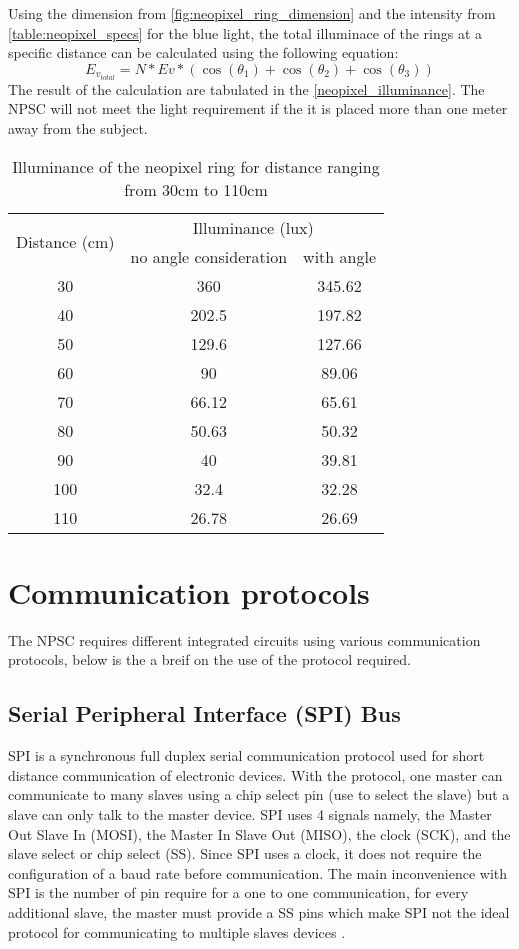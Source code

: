 Using the dimension from \cref{fig:neopixel_ring_dimension} and the intensity from \cref{table:neopixel_specs} for the blue light, the total illuminace of the rings at a specific distance can be calculated using the following equation:
\begin{equation}\label{eq:total_illuminance}
E_{v_{total}} = N*Ev*(\cos(\theta_1)+\cos(\theta_2)+\cos(\theta_3))
\end{equation}
The result of the calculation are tabulated in the \cref{neopixel_illuminance}. The NPSC will not meet the light requirement if the it is placed more than one meter away from the subject.
\begin{table}[h!]
\centering
\begin{tabular}{ccc}
\hline
\hline
\multirow{2}{*}{Distance (cm)}  & \multicolumn{2}{c}{Illuminance (lux)} \\  
 & no angle consideration & with angle \\
\hline
30 & 360 & 345.62\\
40 & 202.5 & 197.82\\
50 & 129.6 & 127.66\\
60 & 90 & 89.06\\
70 & 66.12 & 65.61\\
80 & 50.63 & 50.32\\
90 & 40 & 39.81\\
100 & 32.4 & 32.28\\
110 & 26.78 & 26.69\\
\hline
\hline
\end{tabular}
\caption{Illuminance of the neopixel ring for distance ranging from 30cm to 110cm}
\label{table:neopixel_illuminance}
\end{table}
\section{Communication protocols}
The NPSC requires different integrated circuits using various communication protocols, below is the a breif on the use of the protocol required.

\subsection{Serial Peripheral Interface (SPI) Bus}
SPI is a synchronous full duplex serial communication protocol used for short distance communication of electronic devices. With the protocol, one master can communicate to many slaves using a chip select pin (use to select the slave) but a slave can only talk to the master device. SPI uses 4 signals namely, the Master Out Slave In (MOSI), the Master In Slave Out (MISO), the clock (SCK), and the slave select or chip select (SS). Since SPI uses a clock, it does not require the configuration of a baud rate before communication. The main inconvenience with SPI is the number of pin require for a one to one communication, for every additional slave, the master must provide a SS pins which make SPI not the ideal protocol for communicating to multiple slaves devices \cite{spi}. 

